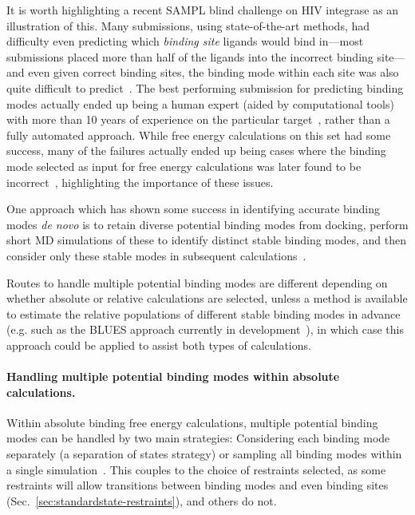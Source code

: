 \documentclass[9pt,bestpractices]{livecoms}
\begin{document}
It is worth highlighting a recent SAMPL blind challenge on HIV integrase as an illustration of this. 
Many submissions, using state-of-the-art methods, had difficulty even predicting which \emph{binding site} ligands would bind in---most submissions placed more than half of the ligands into the incorrect binding site---and even given correct binding sites, the binding mode within each site was also quite difficult to predict~\cite{mobley2014blind}.
The best performing submission for predicting binding modes actually ended up being a human expert (aided by computational tools) with more than 10 years of experience on the particular target~\cite{voet2014combining}, rather than a fully automated approach.
While free energy calculations on this set had some success, many of the failures actually ended up being cases where the binding mode selected as input for free energy calculations was later found to be incorrect~\cite{gallicchio2014virtual}, highlighting the importance of these issues.

One approach which has shown some success in identifying accurate binding modes \emph{de novo} is to retain diverse potential binding modes from docking, perform short MD simulations of these to identify distinct stable binding modes, and then consider only these stable modes in subsequent calculations~\cite{gallicchio2014virtual, mobley2006use,rocklin2013blind, boyce2009predicting, mobley2007predicting}.


Routes to handle multiple potential binding modes are different depending on whether absolute or relative calculations are selected, unless a method is available to estimate the relative populations of different stable binding modes in advance (e.g. such as the BLUES approach currently in development~\cite{gill2018binding}), in which case this approach could be applied to assist both types of calculations.

\paragraph{Handling multiple potential binding modes within absolute calculations.}
Within absolute binding free energy calculations, multiple potential binding modes can be handled by two main strategies: Considering each binding mode separately (a separation of states strategy) or sampling all binding modes within a single simulation~\cite{mobley2012perspective}.
This couples to the choice of restraints selected, as some restraints will allow transitions between binding modes and even binding sites (Sec.~\ref{sec:standardstate-restraints}), and others do not.
\end{document}
